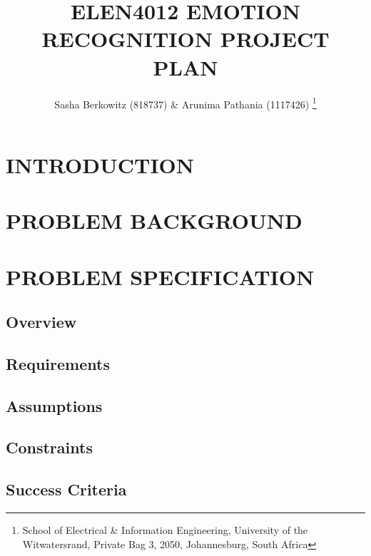 \documentclass[10pt,twocolumn]{witseiepaper}
\begin{document}
\title{ELEN4012 EMOTION RECOGNITION PROJECT PLAN}

\author{Sasha Berkowitz (818737) \& Arunima Pathania (1117426)
\thanks{School of Electrical \& Information Engineering, University of the
Witwatersrand, Private Bag 3, 2050, Johannesburg, South Africa}
}


%
\abstract{ }

\keywords{}

\maketitle
\pagestyle{plain}
\setcounter{page}{1}


\section{INTRODUCTION}

\section{PROBLEM BACKGROUND} %


\section{PROBLEM SPECIFICATION}\label{spec} %
\subsection{Overview}
\subsection{Requirements}
\subsection{Assumptions}
\subsection{Constraints}
\subsection{Success Criteria}
\end{document}
